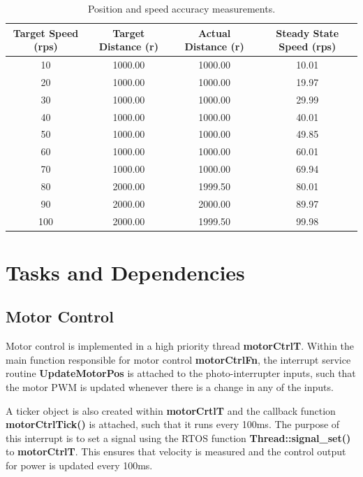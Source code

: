 \documentclass{article}
\begin{document}
\begin{table}[ht]
\centering                      %
\begin{tabular}{c c c c}        %
Target Speed (rps) & Target Distance (r) & Actual Distance (r) & Steady State Speed (rps) \\ [0.5ex]   %
\hline                          %
10 & 1000.00 & 1000.00 & 10.01 \\           %
20 & 1000.00 & 1000.00 & 19.97 \\  
30 & 1000.00 & 1000.00 & 29.99 \\  
40 & 1000.00 & 1000.00 & 40.01 \\  
50 & 1000.00 & 1000.00 & 49.85 \\  
60 & 1000.00 & 1000.00 & 60.01 \\  
70 & 1000.00 & 1000.00 & 69.94 \\  
80 & 2000.00 & 1999.50 & 80.01 \\  
90 & 2000.00 & 2000.00 & 89.97 \\  
100 & 2000.00 & 1999.50 & 99.98 \\  
\end{tabular}
\caption{Position and speed accuracy measurements.}
\label{table:nonlin}            %
\end{table}

\section{Tasks and Dependencies}
\subsection{Motor Control}

\noindent
Motor control is implemented in a high priority thread \textbf{motorCtrlT}. Within the main function responsible for motor control \textbf{motorCtrlFn}, the interrupt service routine \textbf{UpdateMotorPos} is attached to the photo-interrupter inputs, such that the motor PWM is updated whenever there is a change in any of the inputs.

\bigskip

\noindent
A ticker object is also created within \textbf{motorCrtlT} and the callback function \textbf{motorCtrlTick()} is attached, such that it runs every 100ms. The purpose of this interrupt is to set a signal using the RTOS function \textbf{Thread::signal\_set()} to \textbf{motorCtrlT}. This ensures that velocity is measured and the control output for power is updated every 100ms.
\end{document}
